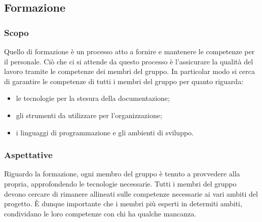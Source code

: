 \subsection{Formazione}
\subsubsection{Scopo}
Quello di formazione è un processo atto a fornire e mantenere le competenze per il personale. Ciò che ci si attende da questo processo è l'assicurare la qualità del lavoro tramite le competenze dei membri del gruppo. 
In particolar modo si cerca di garantire le competenze di tutti i membri del gruppo per quanto riguarda:
\begin{itemize}
	\item le tecnologie per la stesura della documentazione;
	\item gli strumenti da utilizzare per l'organizzazione;
	\item i linguaggi di programmazione e gli ambienti di sviluppo.
\end{itemize}
\subsubsection{Aspettative}
Riguardo la formazione, ogni membro del gruppo è tenuto a provvedere alla propria, approfondendo le tecnologie necessarie. Tutti i membri del gruppo devono cercare di rimanere allineati sulle competenze necessarie ai vari ambiti del progetto. È dunque importante che i membri più esperti in determiti ambiti, condividano le loro competenze con chi ha qualche mancanza.


